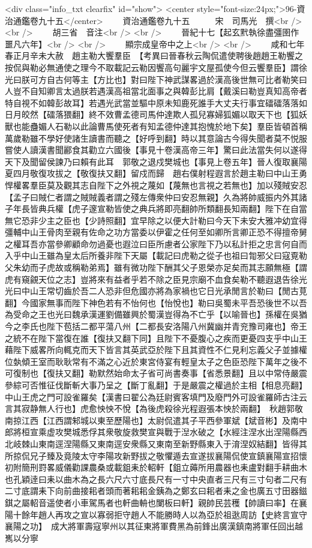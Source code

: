 <div class="info_txt clearfix" id="show">
<center style="font-size:24px;">96-資治通鑑卷九十五</center>
  　　資治通鑑卷九十五　　　宋　司馬光　撰<br />
<br />
　　胡三省　音注<br />
<br />
　　晉紀十七【起玄黓執徐盡彊圉作噩凡六年】<br />
<br />
　　顯宗成皇帝中之上<br />
<br />
　　咸和七年春正月辛未大赦　趙主勒大饗羣臣　【考異曰晉春秋云陶侃遣使聘後趙趙王勒饗之按侃與勒必無通使之理今不取載記云勒因饗高句麗宇文屋孤使今但云饗羣臣】謂徐光曰朕可方自古何等主【方比也】對曰陛下神武謀畧過於漢高後世無可比者勒笑曰人豈不自知卿言太過朕若遇漢高祖當北面事之與韓彭比肩【戴溪曰勒豈真知高帝者特自視不如韓彭故耳】若遇光武當並驅中原未知鹿死誰手大丈夫行事宜礌礌落落如日月皎然【礌落猥翻】終不效曹孟德司馬仲達欺人孤兒寡婦狐媚以取天下也【狐妖獸也能蠱媚人石勒以此論曹馬使死者有知孟德仲達其抱愧於地下矣】羣臣皆頓首稱萬歲勒雖不學好使諸生讀書而聽之【好呼到翻】時以其意論古今得失聞者莫不悦服嘗使人讀漢書聞酈食其勸立六國後【事見十卷漢高帝三年】驚曰此法當失何以遂得天下及聞留侯諫乃曰賴有此耳　郭敬之退戍樊城也【事見上卷五年】晉人復取襄陽夏四月敬復攻拔之【敬復扶又翻】留戍而歸　趙右僕射程遐言於趙主勒曰中山王勇悍權畧羣臣莫及觀其志自陛下之外視之蔑如【蔑無也言視之若無也】加以殘賊安忍【孟子曰賊仁者謂之賊賊義者謂之殘左傳衆仲曰安忍無親】久為將帥威振内外其諸子年長皆典兵權【虎子邃宣勒皆使之典兵將即亮翻帥所類翻長知兩翻】陛下在自當無它恐非少主之臣也【少詩照翻】宜早除之以便大計勒曰今天下未安大雅冲幼宜得彊輔中山王骨肉至親有佐命之功方當委以伊霍之任何至如卿所言卿正恐不得擅帝舅之權耳吾亦當參卿顧命勿過憂也遐泣曰臣所慮者公家陛下乃以私計拒之忠言何自而入乎中山王雖為皇太后所養非陛下天屬【載記曰虎勒之從子也祖曰㔨邪父曰寇覔勒父朱幼而子虎故或稱勒弟焉】雖有微功陛下酬其父子恩榮亦足矣而其志願無極【謂虎有窺覦天位之志】豈將來有益者乎若不除之臣見宗廟不血食矣勒不聽遐退告徐光光曰中山王常切齒於吾二人恐非但危國亦將為家禍也它日光承閒言於勒曰【閒古莧翻】今國家無事而陛下神色若有不怡何也【怡悅也】勒曰吳蜀未平吾恐後世不以吾為受命之王也光曰魏承漢運劉備雖興於蜀漢豈得為不亡乎【以喻晉也】孫權在吳猶今之李氏也陛下苞括二都平蕩八州【二都長安洛陽八州冀幽并青兖豫司雍也】帝王之統不在陛下當復在誰【復扶又翻下同】且陛下不憂腹心之疾而更憂四支乎中山王藉陛下威畧所向輒克而天下皆言其英武亞於陛下且其資性不仁見利忘義父子並據權位埶傾王室而耿耿常有不滿之心近於東宮侍宴有輕皇太子之色臣恐陛下萬年之後不可復制也【復扶又翻】勒默然始命太子省可尚書奏事【省悉景翻】且以中常侍嚴震參綜可否惟征伐斷斬大事乃呈之【斷丁亂翻】于是嚴震之權過於主相【相息亮翻】中山王虎之門可設雀羅矣【漢書曰翟公為廷尉賓客填門及廢門外可設雀羅師古注云言其寂静無人行也】虎愈怏怏不悅【為後虎殺徐光程遐張本怏於兩翻】　秋趙郭敬南掠江西【江西謂邾城以東至歷陽也】太尉侃遣其子平西參軍斌【斌音彬】及南中郎將桓宣乘虚攻樊城悉俘其衆敬旋救樊宣與戰于湼水破之【水經注涅水出涅陽縣西北岐棘山東南逕涅陽縣又東南逕安衆縣又東南至新野縣東入于淯涅奴結翻】皆得其所掠侃兄子臻及竟陵太守李陽攻新野拔之敬懼遁去宣遂拔襄陽侃使宣鎮襄陽宣招懷初附簡刑罸畧威儀勸課農桑或載鉏耒於軺軒【鉏立薅所用農器也耒盧對翻手耕曲木也孔穎逹曰耒以曲木為之長六尺六寸底長尺有一寸中央直者三尺有三寸句者二尺有二寸底謂耒下向前曲接耜者頭而著耜耜金銕為之鄭玄曰耜者耒之金也廣五寸田器鎡錤之屬軺音遥使者小車駕馬者也軒曲輈也闌板曰軒】親帥民芸穫【帥讀曰率】在襄陽十餘年趙人再攻之宣以寡弱拒守趙人不能勝時人以為亞於祖逖周訪【史終言宣守襄陽之功】　成大將軍壽寇寧州以其征東將軍費黑為前鋒出廣漢鎮南將軍任回出越嶲以分寧